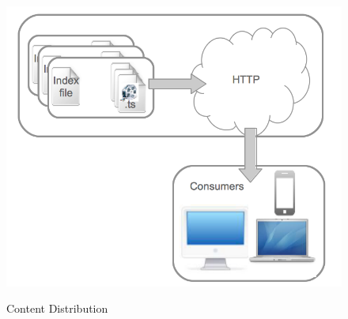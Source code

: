 \begin{figure}[htb]
  \centering
  \includegraphics[scale=0.7]{img/content_distribution.png}\\
  \caption{Content Distribution}
  \label{fig:content_distribution}
\end{figure}


